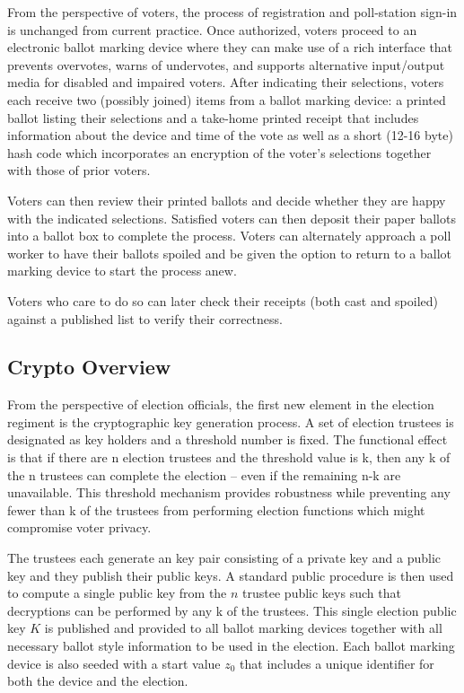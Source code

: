 \label{sec:design}

From the perspective of voters, the process of registration and poll-station sign-in is unchanged from current practice.  Once authorized, voters proceed to an electronic ballot marking device where they can make use of a rich interface that prevents overvotes, warns of undervotes, and supports alternative input/output media for disabled and impaired voters.  After indicating their selections, voters each receive two (possibly joined) items from a ballot marking device:  a printed ballot listing their selections and a take-home printed receipt that includes information about the device and time of the vote as well as a short (12-16 byte) hash code which incorporates an encryption of the voter's selections together with those of prior voters.

Voters can then review their printed ballots and decide whether they are happy with the indicated selections.  Satisfied voters can then deposit their paper ballots into a ballot box to complete the process.  Voters can alternately approach a poll worker to have their ballots spoiled and be given the option to return to a ballot marking device to start the process anew.

Voters who care to do so can later check their receipts (both cast and spoiled) against a published list to verify their correctness.

\subsection{Crypto Overview}
From the perspective of election officials, the first new element in the election regiment is the cryptographic key generation process.  A set of election trustees is designated as key holders and a threshold number is fixed.  The functional effect is that if there are n election trustees and the threshold value is k, then any k of the n trustees can complete the election – even if the remaining n-k are unavailable.  This threshold mechanism provides robustness while preventing any fewer than k of the trustees from performing election functions which might compromise voter privacy.

The trustees each generate an \elgamal key pair consisting of a private key and a public key and they publish their public keys.  A standard public procedure is then used to compute a single \elgamal  public key from the $n$ trustee public keys such that decryptions can be performed by any k of the trustees.  This single \elgamal election public key $K$ is published and provided to all ballot marking devices together with all necessary ballot style information to be used in the election.  Each ballot marking device is also seeded with a start value $z_0$ that includes a unique identifier for both the device and the election.

